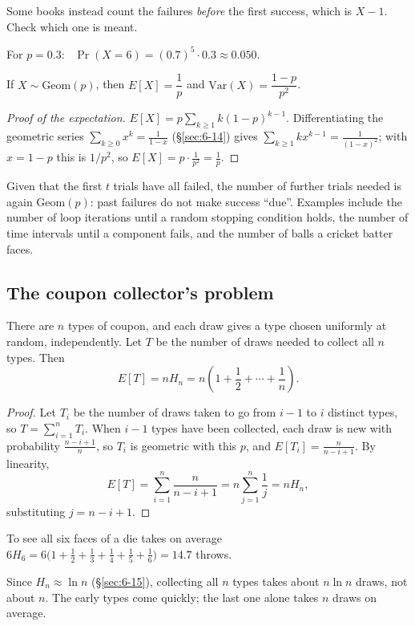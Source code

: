 \begin{note}
Some books instead count the failures \emph{before} the first success, which is $X-1$. Check which one is meant.
\end{note}

\begin{example}
For $p=0.3$: \ $\Pr(X=6)=(0.7)^5\cdot0.3\approx0.050$.
\end{example}

\begin{proposition}
If $X\sim\mathrm{Geom}(p)$, then $E[X] = \dfrac1p$ and $\mathrm{Var}(X)=\dfrac{1-p}{p^2}$.
\end{proposition}
\begin{proof}[Proof of the expectation]
$E[X] = p\sum_{k\ge1} k(1-p)^{k-1}$. Differentiating the geometric series $\sum_{k\ge0}x^k=\frac1{1-x}$ (\S\ref{sec:6-14}) gives $\sum_{k\ge1}kx^{k-1}=\frac1{(1-x)^2}$; with $x=1-p$ this is $1/p^2$, so $E[X]=p\cdot\frac1{p^2}=\frac1p$.
\end{proof}

\begin{note}
Given that the first $t$ trials have all failed, the number of further trials needed is again $\mathrm{Geom}(p)$: past failures do not make success ``due''. Examples include the number of loop iterations until a random stopping condition holds, the number of time intervals until a component fails, and the number of balls a cricket batter faces.
\end{note}

\subsection{The coupon collector's problem}
\label{sec:10-11}

\begin{theorem}
There are $n$ types of coupon, and each draw gives a type chosen uniformly at random, independently. Let $T$ be the number of draws needed to collect all $n$ types. Then
\[
E[T] = n H_n = n\left(1+\frac12+\cdots+\frac1n\right).
\]
\end{theorem}
\begin{proof}
Let $T_i$ be the number of draws taken to go from $i-1$ to $i$ distinct types, so $T=\sum_{i=1}^n T_i$. When $i-1$ types have been collected, each draw is new with probability $\frac{n-i+1}{n}$, so $T_i$ is geometric with this $p$, and $E[T_i]=\frac{n}{n-i+1}$. By linearity,
\[
E[T] = \sum_{i=1}^n \frac{n}{n-i+1} = n\sum_{j=1}^n\frac1j = nH_n,
\]
substituting $j=n-i+1$.
\end{proof}

\begin{example}
To see all six faces of a die takes on average $6H_6=6\bigl(1+\frac12+\frac13+\frac14+\frac15+\frac16\bigr)=14.7$ throws.
\end{example}

\begin{note}
Since $H_n\approx\ln n$ (\S\ref{sec:6-15}), collecting all $n$ types takes about $n\ln n$ draws, not about $n$. The early types come quickly; the last one alone takes $n$ draws on average.
\end{note}

